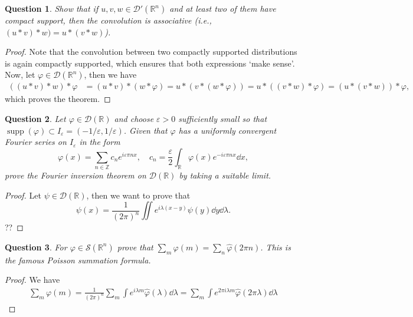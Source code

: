 \documentclass{article}
\theoremstyle{plain}
\newtheorem{question}{Question}
\theoremstyle{remark}
\renewcommand{\epsilon}{\varepsilon}
\renewcommand{\phi}{\varphi}
\newcommand{\Bb}{\mathbb}
\newcommand{\Cal}{\mathcal}
\newcommand\ZZ{\Bb Z}
\newcommand{\RR}{\Bb R}
\newcommand{\DD}{\Cal D}
\renewcommand\SS{\Cal S}
\newcommand\eps\epsilon
\DeclareMathOperator{\supp}{supp}
\begin{document}
\begin{question}
	Show that if $u, v, w \in \DD'(\RR^n)$ and at least two of them have compact support, then the convolution is associative (i.e., $(u * v) * w) = u* (v * w)$). 
\end{question}

\begin{proof}
	Note that the convolution between two compactly supported distributions is again compactly supported, which ensures that both expressions `make sense'. Now, let $\phi \in \DD(\RR^n)$, then we have
	\begin{align*}
		((u * v) * w) * \phi &= (u* v) * (w * \phi) = u * (v * ( w* \phi)) = u * ((v * w) * \phi) = (u * (v * w)) * \phi,
	\end{align*}
	which proves the theorem. 
\end{proof}

\begin{question}
	Let $\phi \in \DD(\RR)$ and choose $\eps > 0$ sufficiently small so that $\supp(\phi) \subset I_\eps = (-1/\eps, 1/\eps)$. Given that $\phi$ has a uniformly convergent Fourier series on $I_\eps$ in the form
	\[
	\phi(x) = \sum_{n \in \ZZ} c_n e^{i \eps \pi n x}, \quad c_n = \frac\eps2 \int_\RR \phi(x) e^{-i\eps \pi n x} \dd{x},
	\]
	prove the Fourier inversion theorem on $\DD(\RR)$ by taking a suitable limit. 
\end{question}

\begin{proof}
	Let $\psi \in \DD(\RR)$, then we want to prove that \[
	\psi(x) = \frac1{(2\pi)^n} \iint e^{i \lambda (x - y)} \psi(y) \dd{y} \dd{\lambda}. 
	\]
	??
\end{proof}

\begin{question}
	For $\phi \in \SS(\RR^n)$ prove that $\sum_m \phi(m) = \sum_n \hat\phi(2\pi n)$. This is the famous Poisson summation formula. 
\end{question}

\begin{proof}
	We have
	\begin{align*}
		\sum_m \phi(m) = \frac1{(2\pi)^n} \sum_m \int e^{i\lambda m} \hat \phi(\lambda) \dd{\lambda} = \sum_m \int e^{2\pi i \lambda m} \hat \phi(2\pi \lambda) \dd{\lambda}
	\end{align*}
\end{proof}
\end{document}
